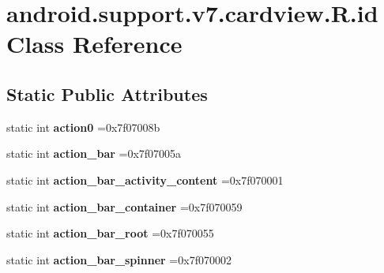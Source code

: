 \hypertarget{classandroid_1_1support_1_1v7_1_1cardview_1_1R_1_1id}{}\section{android.\+support.\+v7.\+cardview.\+R.\+id Class Reference}
\label{classandroid_1_1support_1_1v7_1_1cardview_1_1R_1_1id}
\subsection*{Static Public Attributes}
\begin{DoxyCompactItemize}
\item 
\mbox{\label{classandroid_1_1support_1_1v7_1_1cardview_1_1R_1_1id_a305fd8cdb156b5e1d819db7732424186}} 
static int {\bfseries action0} =0x7f07008b
\item 
\mbox{\label{classandroid_1_1support_1_1v7_1_1cardview_1_1R_1_1id_a542fd097c6bae78893ac98697439296b}} 
static int {\bfseries action\+\_\+bar} =0x7f07005a
\item 
\mbox{\label{classandroid_1_1support_1_1v7_1_1cardview_1_1R_1_1id_ae61f3ee849ea3cf286cbb2ac07e426d0}} 
static int {\bfseries action\+\_\+bar\+\_\+activity\+\_\+content} =0x7f070001
\item 
\mbox{\label{classandroid_1_1support_1_1v7_1_1cardview_1_1R_1_1id_aa1391ad94c6138263770813e44ec358a}} 
static int {\bfseries action\+\_\+bar\+\_\+container} =0x7f070059
\item 
\mbox{\label{classandroid_1_1support_1_1v7_1_1cardview_1_1R_1_1id_a610127375cf215c642567ff0319403d3}} 
static int {\bfseries action\+\_\+bar\+\_\+root} =0x7f070055
\item 
\mbox{\label{classandroid_1_1support_1_1v7_1_1cardview_1_1R_1_1id_a856a9dec50adc6ca2d1338c110021d8e}} 
static int {\bfseries action\+\_\+bar\+\_\+spinner} =0x7f070002
\item 

\end{DoxyCompactItemize}
